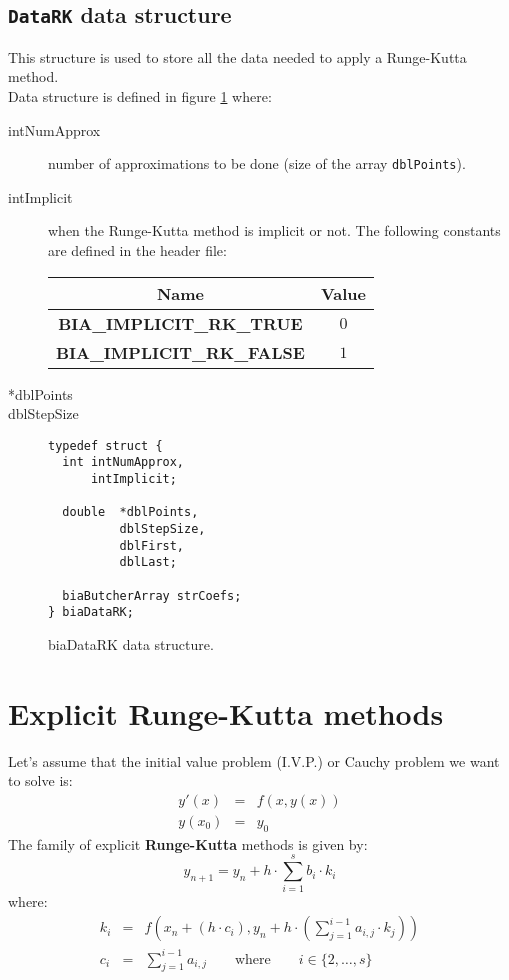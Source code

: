 \subsection{\texttt{DataRK} data structure}

This structure is used to store all the data needed to apply a Runge-Kutta method.\\

Data structure is defined in figure \ref{fig:biaDataRK} where:
%
\begin{description}
%
\item[intNumApprox] number of approximations to be done (size of the array \texttt{dblPoints}).
%
\item[intImplicit] when the Runge-Kutta method is implicit or not. The following constants are defined in the header file:
%
  \begin{center}
  \begin{tabular}{|c|c|}
    \hline
    \textbf{Name} & \textbf{Value} \\
    \hline
    \textbf{BIA\_IMPLICIT\_RK\_TRUE} & $0$ \\
    \hline
    \textbf{BIA\_IMPLICIT\_RK\_FALSE} & $1$ \\
    \hline
  \end{tabular}
  \end{center}  
%
\item[*dblPoints]
%
\item[dblStepSize]
%
\end{description}

\begin{figure}[!h]
\begin{verbatim}
typedef struct {
  int intNumApprox,
      intImplicit;

  double  *dblPoints,
          dblStepSize,
          dblFirst,
          dblLast;

  biaButcherArray strCoefs;
} biaDataRK;
\end{verbatim}
\caption{biaDataRK data structure.} \label{fig:biaDataRK}
\end{figure}
%
\FloatBarrier

\section{Explicit Runge-Kutta methods}

Let's assume that the initial value problem (I.V.P.) or Cauchy problem we want to solve is:
%
\begin{eqnarray*}
  y'(x) & = & f(x, y(x)) \\
  y(x_0) & = & y_0
\end{eqnarray*}
%
The family of explicit \textbf{Runge-Kutta} methods is given by:
%
\begin{displaymath}
  y_{n+1} = y_n  + h \cdot \sum_{i=1}^s b_i \cdot k_i
\end{displaymath}
%
where:
%
\begin{eqnarray*}
  k_i & = & f(x_n + (h\cdot c_i), y_n + h\cdot \left(\sum_{j=1}^{i-1} a_{i,j} \cdot k_j \right) )\\
  c_i & = & \sum_{j=1}^{i-1} a_{i,j} \qquad \textrm{where} \qquad i \in \{2,\dots,s\}
\end{eqnarray*}

